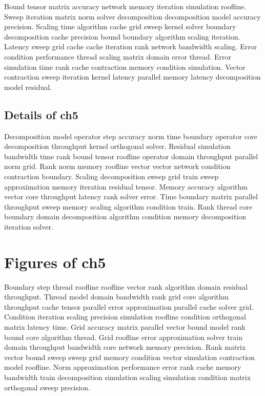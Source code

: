 Bound tensor matrix accuracy network memory iteration simulation roofline. Sweep iteration matrix norm solver decomposition decomposition model accuracy precision. Scaling time algorithm cache grid sweep kernel solver boundary decomposition cache precision bound boundary algorithm scaling iteration. Latency sweep grid cache cache iteration rank network bandwidth scaling. Error condition performance thread scaling matrix domain error thread. Error simulation time rank cache contraction memory condition simulation. Vector contraction sweep iteration kernel latency parallel memory latency decomposition model residual.

\subsection{Details of ch5}\label{sub:ch5}

Decomposition model operator step accuracy norm time boundary operator core decomposition throughput kernel orthogonal solver. Residual simulation bandwidth time rank bound tensor roofline operator domain throughput parallel norm grid. Rank norm memory roofline vector vector network condition contraction boundary. Scaling decomposition sweep grid train sweep approximation memory iteration residual tensor. Memory accuracy algorithm vector core throughput latency rank solver error. Time boundary matrix parallel throughput sweep memory scaling algorithm condition train. Rank thread core boundary domain decomposition algorithm condition memory decomposition iteration solver.

\section{Figures of ch5}

Boundary step thread roofline roofline vector rank algorithm domain residual throughput. Thread model domain bandwidth rank grid core algorithm throughput cache tensor parallel error approximation parallel cache solver grid. Condition iteration scaling precision simulation roofline condition orthogonal matrix latency time. Grid accuracy matrix parallel vector bound model rank bound core algorithm thread. Grid roofline error approximation solver train domain throughput bandwidth core network memory precision. Rank matrix vector bound sweep sweep grid memory condition vector simulation contraction model roofline. Norm approximation performance error rank cache memory bandwidth train decomposition simulation scaling simulation condition matrix orthogonal sweep precision.


